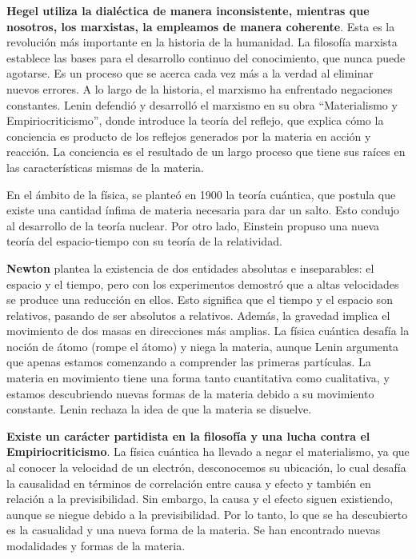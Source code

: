 \documentclass[
  letterpaper,
  DIV=11,
  numbers=noendperiod]{scrartcl}
\begin{document}
\textbf{Hegel utiliza la dialéctica de manera inconsistente, mientras
que nosotros, los marxistas, la empleamos de manera coherente}. Esta es
la revolución más importante en la historia de la humanidad. La
filosofía marxista establece las bases para el desarrollo continuo del
conocimiento, que nunca puede agotarse. Es un proceso que se acerca cada
vez más a la verdad al eliminar nuevos errores. A lo largo de la
historia, el marxismo ha enfrentado negaciones constantes. Lenin
defendió y desarrolló el marxismo en su obra ``Materialismo y
Empiriocriticismo'', donde introduce la teoría del reflejo, que explica
cómo la conciencia es producto de los reflejos generados por la materia
en acción y reacción. La conciencia es el resultado de un largo proceso
que tiene sus raíces en las características mismas de la materia.

En el ámbito de la física, se planteó en 1900 la teoría cuántica, que
postula que existe una cantidad ínfima de materia necesaria para dar un
salto. Esto condujo al desarrollo de la teoría nuclear. Por otro lado,
Einstein propuso una nueva teoría del espacio-tiempo con su teoría de la
relatividad.

\textbf{Newton} plantea la existencia de dos entidades absolutas e
inseparables: el espacio y el tiempo, pero con los experimentos demostró
que a altas velocidades se produce una reducción en ellos. Esto
significa que el tiempo y el espacio son relativos, pasando de ser
absolutos a relativos. Además, la gravedad implica el movimiento de dos
masas en direcciones más amplias. La física cuántica desafía la noción
de átomo (rompe el átomo) y niega la materia, aunque Lenin argumenta que
apenas estamos comenzando a comprender las primeras partículas. La
materia en movimiento tiene una forma tanto cuantitativa como
cualitativa, y estamos descubriendo nuevas formas de la materia debido a
su movimiento constante. Lenin rechaza la idea de que la materia se
disuelve.

\textbf{Existe un carácter partidista en la filosofía y una lucha contra
el Empiriocriticismo}. La física cuántica ha llevado a negar el
materialismo, ya que al conocer la velocidad de un electrón,
desconocemos su ubicación, lo cual desafía la causalidad en términos de
correlación entre causa y efecto y también en relación a la
previsibilidad. Sin embargo, la causa y el efecto siguen existiendo,
aunque se niegue debido a la previsibilidad. Por lo tanto, lo que se ha
descubierto es la casualidad y una nueva forma de la materia. Se han
encontrado nuevas modalidades y formas de la materia.
\end{document}
